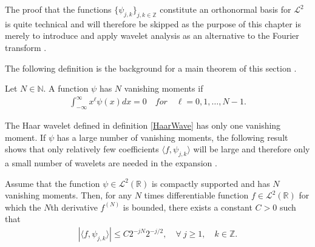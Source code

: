 The proof that the functions $\{\psi_{j,k}\}_{j,k\in\mathbb{Z}}$ constitute an orthonormal basis for $\mathcal{L}^2$ is quite technical and will therefore be skipped as the purpose of this chapter is merely to introduce and apply wavelet analysis as an alternative to the Fourier transform \cite{page 161, FSE2010} .

The following definition is the background for a main theorem of this section \cite{page 170, FSE2010}.

\begin{definition}
Let $N \in \mathbb{N}$. A function $\psi$ has $N$ vanishing moments if
\begin{align*}
\int_{-\infty}^\infty x^\ell \psi(x) dx = 0 \quad for \quad \ell = 0, 1, \dots, N-1.
\end{align*}
\end{definition}

The Haar wavelet defined in definition \ref{HaarWave} has only one vanishing moment. If $\psi$ has a large number of vanishing moments, the following result shows that only relatively few coefficients $\langle f, \psi_{j,k} \rangle$ will be large and therefore only a small number of wavelets are needed in the expansion .

\begin{theorem}
Assume that the function $\psi \in \mathcal{L}^2(\mathbb{R})$ is compactly supported and has $N$ vanishing moments. Then, for any $N$ times differentiable function $f \in \mathcal{L}^2(\mathbb{R})$ for which the $N$th derivative $f^{(N)}$ is bounded, there exists a constant $C > 0$ such that
\begin{align} \label{eq:decay_wave_coeff}
|\langle f, \psi_{j,k} \rangle| \leq C 2^{-jN} 2^{-j/2}, \quad \forall \ j \geq 1, \quad k \in \mathbb{Z}.
\end{align}
\end{theorem}


